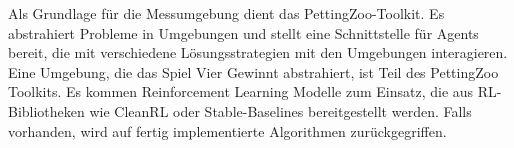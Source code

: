 Als Grundlage für die Messumgebung dient das PettingZoo-Toolkit. Es abstrahiert Probleme in Umgebungen und stellt eine Schnittstelle für Agents bereit, die mit verschiedene Lösungsstrategien mit den Umgebungen interagieren. Eine Umgebung, die das Spiel Vier Gewinnt abstrahiert, ist Teil des PettingZoo Toolkits. Es kommen Reinforcement Learning Modelle zum Einsatz, die aus RL-Bibliotheken wie CleanRL oder Stable-Baselines bereitgestellt werden. Falls vorhanden, wird auf fertig implementierte Algorithmen zurückgegriffen.

\newpage